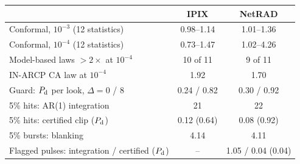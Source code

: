 \begin{tabular}{lcc}
\toprule
 & IPIX & NetRAD\\
\midrule
Conformal, $10^{-3}$ (12 statistics) & 0.98--1.14 & 1.01--1.36\\
Conformal, $10^{-4}$ (12 statistics) & 0.73--1.47 & 1.02--4.26\\
Model-based laws $>2\times$ at $10^{-4}$ & 10 of 11 & 9 of 11\\
IN-ARCP CA law at $10^{-4}$ & 1.92 & 1.70\\
Guard: $P_{\rm d}$ per look, $\Delta=0$ / 8 & 0.24 / 0.82 & 0.30 / 0.92\\
5\% hits: AR(1) integration & 21 & 22\\
5\% hits: certified clip ($P_{\rm d}$) & 0.12 (0.64) & 0.08 (0.92)\\
5\% bursts: blanking & 4.14 & 4.11\\
Flagged pulses: integration / certified ($P_{\rm d}$) & -- & 1.05 / 0.04 (0.04)\\
\bottomrule
\end{tabular}
